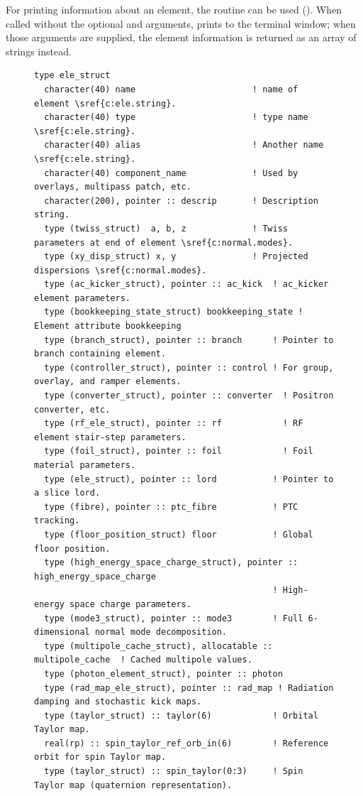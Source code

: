 For printing information about an element, the
 routine can be used ().
When called without the optional  and  arguments, 
prints to the terminal window; when those arguments are supplied, the element
information is returned as an array of strings instead.
\nopagebreak[4]
\begin{figure}[htb]
\centering
\footnotesize
\begin{verbatim}
type ele_struct
  character(40) name                       ! name of element \sref{c:ele.string}.
  character(40) type                       ! type name \sref{c:ele.string}.
  character(40) alias                      ! Another name \sref{c:ele.string}.
  character(40) component_name             ! Used by overlays, multipass patch, etc.
  character(200), pointer :: descrip       ! Description string.
  type (twiss_struct)  a, b, z             ! Twiss parameters at end of element \sref{c:normal.modes}.
  type (xy_disp_struct) x, y               ! Projected dispersions \sref{c:normal.modes}.
  type (ac_kicker_struct), pointer :: ac_kick  ! ac_kicker element parameters.
  type (bookkeeping_state_struct) bookkeeping_state ! Element attribute bookkeeping
  type (branch_struct), pointer :: branch      ! Pointer to branch containing element.
  type (controller_struct), pointer :: control ! For group, overlay, and ramper elements.
  type (converter_struct), pointer :: converter  ! Positron converter, etc.
  type (rf_ele_struct), pointer :: rf            ! RF element stair-step parameters.
  type (foil_struct), pointer :: foil            ! Foil material parameters.
  type (ele_struct), pointer :: lord           ! Pointer to a slice lord.
  type (fibre), pointer :: ptc_fibre           ! PTC tracking.
  type (floor_position_struct) floor           ! Global floor position.
  type (high_energy_space_charge_struct), pointer :: high_energy_space_charge
                                               ! High-energy space charge parameters.
  type (mode3_struct), pointer :: mode3        ! Full 6-dimensional normal mode decomposition.
  type (multipole_cache_struct), allocatable :: multipole_cache  ! Cached multipole values.
  type (photon_element_struct), pointer :: photon
  type (rad_map_ele_struct), pointer :: rad_map ! Radiation damping and stochastic kick maps.
  type (taylor_struct) :: taylor(6)            ! Orbital Taylor map.
  real(rp) :: spin_taylor_ref_orb_in(6)        ! Reference orbit for spin Taylor map.
  type (taylor_struct) :: spin_taylor(0:3)     ! Spin Taylor map (quaternion representation).

\end{verbatim}
\end{figure}
